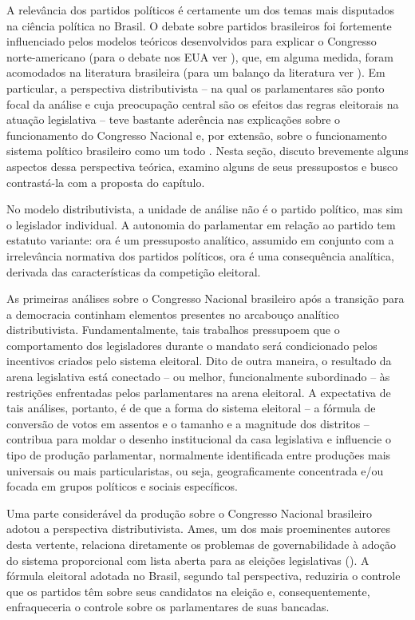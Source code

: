 A relevância dos partidos políticos é certamente um dos temas mais disputados na ciência política no Brasil. O debate sobre partidos brasileiros foi fortemente influenciado pelos modelos teóricos desenvolvidos para explicar o Congresso norte-americano (para o debate nos EUA ver \citealp{Cox1993}), que, em alguma medida, foram acomodados na literatura brasileira (para um balanço da literatura ver \citealp[Capítulo 1]{Carvalho2003}). Em particular, a perspectiva distributivista -- na qual os parlamentares são ponto focal da análise e cuja preocupação central são os efeitos das regras eleitorais na atuação legislativa -- teve bastante aderência nas explicações sobre o funcionamento do Congresso Nacional e, por extensão, sobre o funcionamento sistema político brasileiro como um todo \citep*{Ames1995, Ames1995a, Ames2001, Ames2011, Mainwaring1991, Mainwaring1999, Samuels1997, Carvalho2003, Pereira2001, Pereira2007, Lemos2011}. Nesta seção, discuto brevemente alguns aspectos dessa perspectiva teórica, examino alguns de seus pressupostos e busco contrastá-la com a proposta do capítulo. 

No modelo distributivista, a unidade de análise não é o partido político, mas sim o legislador individual. A autonomia do parlamentar em relação ao partido tem estatuto variante: ora é um pressuposto analítico, assumido em conjunto com a irrelevância normativa dos partidos políticos, ora é uma consequência analítica, derivada das características da competição eleitoral.

As primeiras análises sobre o Congresso Nacional brasileiro após a transição para a democracia continham elementos presentes no arcabouço analítico distributivista. Fundamentalmente, tais trabalhos pressupoem que o comportamento dos legisladores durante o mandato será condicionado pelos incentivos criados pelo sistema eleitoral. Dito de outra maneira, o resultado da arena legislativa está conectado -- ou melhor, funcionalmente subordinado -- às restrições enfrentadas pelos parlamentares na arena eleitoral. A expectativa de tais análises, portanto, é de que a forma do sistema eleitoral -- a fórmula de conversão de votos em assentos e o tamanho e a magnitude dos distritos -- contribua para moldar o desenho institucional da casa legislativa e influencie o tipo de produção parlamentar, normalmente identificada entre produções mais universais ou mais particularistas, ou seja, geograficamente concentrada e/ou focada em grupos políticos e sociais específicos. 

Uma parte considerável da produção sobre o Congresso Nacional brasileiro adotou a perspectiva distributivista. Ames, um dos mais proeminentes autores desta vertente, relaciona diretamente os problemas de governabilidade à adoção do sistema proporcional com lista aberta para as eleições legislativas (\citealp{Ames2001}). A fórmula eleitoral adotada no Brasil, segundo tal perspectiva, reduziria o controle que os partidos têm sobre seus candidatos na eleição e, consequentemente, enfraqueceria o controle sobre os parlamentares de suas bancadas.


